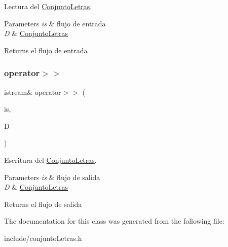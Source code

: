 Lectura del \mbox{\hyperlink{classConjuntoLetras}{Conjunto\+Letras}}. 


\begin{DoxyParams}{Parameters}
{\em is} & flujo de entrada \\
\hline
{\em D} & \mbox{\hyperlink{classConjuntoLetras}{Conjunto\+Letras}} \\
\hline
\end{DoxyParams}
\begin{DoxyReturn}{Returns}
el flujo de entrada 
\end{DoxyReturn}
\mbox{\label{classConjuntoLetras_af608a83f506727554afbe72099b53e8d}} 
\subsubsection{\texorpdfstring{operator$>$$>$}{operator>>}}
{\footnotesize\ttfamily istream\& operator$>$$>$ (\begin{DoxyParamCaption}\item[{istream \&}]{is,  }\item[{\mbox{\hyperlink{classConjuntoLetras}{Conjunto\+Letras}} \&}]{D }\end{DoxyParamCaption})\hspace{0.3cm}{\ttfamily [friend]}}



Escritura del \mbox{\hyperlink{classConjuntoLetras}{Conjunto\+Letras}}. 


\begin{DoxyParams}{Parameters}
{\em is} & flujo de salida \\
\hline
{\em D} & \mbox{\hyperlink{classConjuntoLetras}{Conjunto\+Letras}} \\
\hline
\end{DoxyParams}
\begin{DoxyReturn}{Returns}
el flujo de salida 
\end{DoxyReturn}


The documentation for this class was generated from the following file\+:\begin{DoxyCompactItemize}
\item 
include/conjunto\+Letras.\+h\end{DoxyCompactItemize}
